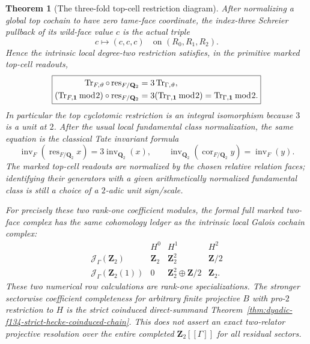 \documentclass[11pt]{article}
\newtheorem{theorem}{Theorem}[section]
\theoremstyle{definition}
\begin{document}
\begin{theorem}[The three-fold top-cell restriction diagram]
After normalizing
a global top
cochain to have
zero tame-face
coordinate, the
index-three
Schreier pullback
of its wild-face
value $c$ is the
actual triple
\begin{equation}\label{eq:dyadic-f134-three-face-restriction}
\boxed{\qquad
c\longmapsto(c,c,c)
\quad\text{on }
(R_0,R_1,R_2).
\qquad}
\end{equation}
Hence the
intrinsic local
degree-two
restriction
satisfies, in
the primitive
marked top-cell
readouts,
\begin{equation}\label{eq:dyadic-f134-trace-restriction-three}
\boxed{
\begin{aligned}
\operatorname{Tr}_{F,\vartheta}
\circ\operatorname{res}_{F/\mathbf Q_2}
&=
3\operatorname{Tr}_{\Gamma,\vartheta},\\
(\operatorname{Tr}_{F,\bf1}\bmod2)
\circ\operatorname{res}_{F/\mathbf Q_2}
&=
3(\operatorname{Tr}_{\Gamma,\bf1}\bmod2)
=
\operatorname{Tr}_{\Gamma,\bf1}\bmod2.
\end{aligned}}
\end{equation}
In particular the
top cyclotomic
restriction
is an \emph{integral
isomorphism}
because $3$ is
a unit at $2$.
After the usual
local fundamental
class normalization,
the same equation
is the classical
Tate invariant
formula
\begin{equation}\label{eq:dyadic-f134-local-tate-trace-normalization}
\operatorname{inv}_{F}
(\operatorname{res}_{F/\mathbf Q_2}x)
=
3\operatorname{inv}_{\mathbf Q_2}(x),
\qquad
\operatorname{inv}_{\mathbf Q_2}
(\operatorname{cor}_{F/\mathbf Q_2}y)
=
\operatorname{inv}_{F}(y).
\end{equation}
The marked top-cell
readouts are normalized
by the chosen
relative relation
faces; identifying
their generators
with a given
arithmetically
normalized
fundamental class
is still a choice
of a $2$-adic
unit sign/scale.

For precisely these
two rank-one
coefficient modules,
the \emph{formal}
full marked
two-face complex
has the same
cohomology ledger
as the intrinsic
local Galois
cochain complex:
\begin{equation}\label{eq:dyadic-f134-global-rankone-ledgers}
\begin{array}{c|ccc}
&H^0&H^1&H^2\\ \hline
\mathcal J_\Gamma(\mathbf Z_2)
&\mathbf Z_2&\mathbf Z_2^2&\mathbf Z/2\\
\mathcal J_\Gamma(\mathbf Z_2(1))
&0&\mathbf Z_2^2\oplus\mathbf Z/2&
\mathbf Z_2 .
\end{array}
\end{equation}
These two numerical
row calculations
are rank-one
specializations.
The stronger
\emph{sectorwise
coefficient}
completeness for
arbitrary finite
projective $B$
with pro-$2$
restriction to $H$
is the strict
coinduced
direct-summand
Theorem~\ref{thm:dyadic-f134-strict-hecke-coinduced-chain}.
This does not
assert an exact
two-relator
projective resolution
over the entire
completed
$\mathbf Z_2[[\Gamma]]$
for all residual
sectors.
\end{theorem}
\end{document}
